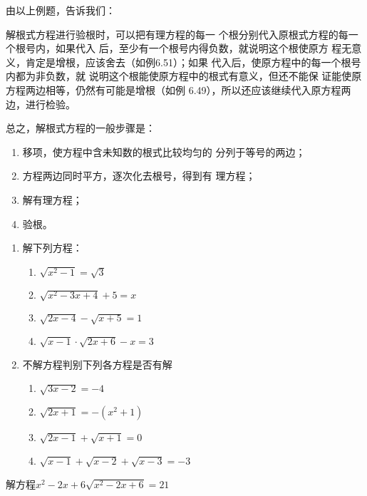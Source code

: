 由以上例题，告诉我们：

解根式方程进行验根时，可以把有理方程的每一
个根分别代入原根式方程的每一个根号内，如果代入
后，至少有一个根号内得负数，就说明这个根使原方
程无意义，肯定是增根，应该舍去（如例6.51）；如果
代入后，使原方程中的每一个根号内都为非负数，就
说明这个根能使原方程中的根式有意义，但还不能保
证能使原方程两边相等，仍然有可能是增根（如例
6.49），所以还应该继续代入原方程两边，进行检验。

总之，解根式方程的一般步骤是：
\begin{enumerate}
    \item 移项，使方程中含未知数的根式比较均匀的
    分列于等号的两边；
    \item 方程两边同时平方，逐次化去根号，得到有
    理方程；
    \item 解有理方程；
    \item 验根。
\end{enumerate}

\begin{ex}
\begin{enumerate}
    \item 解下列方程：
    \begin{multicols}{2}
      \begin{enumerate}
    \item $\sqrt{x^2-1}=\sqrt{3}$
    \item $\sqrt{x^2-3x+4}+5=x$
    \item $\sqrt{2x-4}-\sqrt{x+5}=1$
    \item $\sqrt{x-1}\cdot \sqrt{2x+6}-x=3$
    \end{enumerate}      
    \end{multicols}


    \item 不解方程判别下列各方程是否有解
      \begin{enumerate}
        \item $\sqrt{3x-2}=-4$
    \item $\sqrt{2x+1}=-(x^2+1)$
    \item $\sqrt{2x-1}+\sqrt{x+1}=0$
    \item $\sqrt{x-1}+\sqrt{x-2}+\sqrt{x-3}=-3$
    \end{enumerate}  
\end{enumerate}
\end{ex}

\begin{example}
解方程$x^2-2x+6\sqrt{x^2-2x+6}=21$
\end{example}


